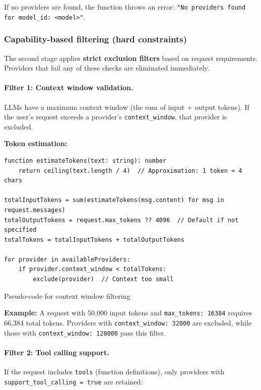 \documentclass[english]{article}
\begin{document}
If no providers are found, the function throws an error: \texttt{"No providers found for model\_id: <model>"}.

\subsubsection{Capability-based filtering (hard constraints)}

The second stage applies \textbf{strict exclusion filters} based on request requirements. Providers that fail any of these checks are eliminated immediately.

\paragraph{Filter 1: Context window validation.}

LLMs have a maximum context window (the sum of input + output tokens). If the user's request exceeds a provider's \texttt{context\_window}, that provider is excluded.

\textbf{Token estimation:}
\begin{listing}[H]
\begin{verbatim}
function estimateTokens(text: string): number
    return ceiling(text.length / 4)  // Approximation: 1 token ≈ 4 chars

totalInputTokens = sum(estimateTokens(msg.content) for msg in request.messages)
totalOutputTokens = request.max_tokens ?? 4096  // Default if not specified
totalTokens = totalInputTokens + totalOutputTokens

for provider in availableProviders:
    if provider.context_window < totalTokens:
        exclude(provider)  // Context too small
\end{verbatim}
\caption{Pseudo-code for context window filtering}
\end{listing}

\textbf{Example:} A request with 50,000 input tokens and \texttt{max\_tokens: 16384} requires 66,384 total tokens. Providers with \texttt{context\_window: 32000} are excluded, while those with \texttt{context\_window: 128000} pass this filter.

\paragraph{Filter 2: Tool calling support.}

If the request includes \texttt{tools} (function definitions), only providers with \texttt{support\_tool\_calling = true} are retained:
\end{document}
